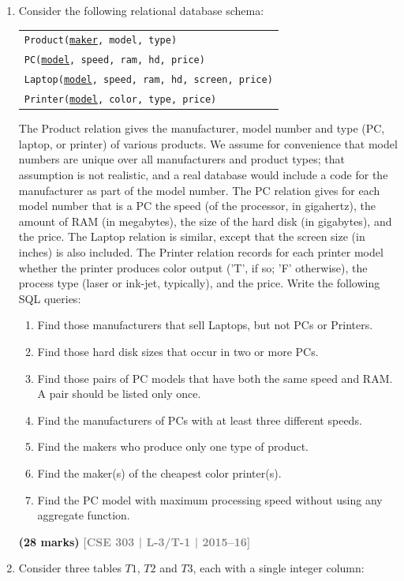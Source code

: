 \documentclass[12pt,a3paper]{article}
\newcommand{\yr}[1]{\hfill\textcolor{gray}{\small\textbf{[#1]}}}
\newcommand{\mk}[1]{\textcolor{orange!70!black}{\small\textbf{(#1 marks)}}}
\begin{document}
\begin{enumerate}
\item Consider the following relational database schema:
\begin{center}
\begin{tabular}{l}
\texttt{Product(\underline{maker}, model, type)}\\
\texttt{PC(\underline{model}, speed, ram, hd, price)}\\
\texttt{Laptop(\underline{model}, speed, ram, hd, screen, price)}\\
\texttt{Printer(\underline{model}, color, type, price)}
\end{tabular}
\end{center}
The Product relation gives the manufacturer, model number and type (PC, laptop, or
printer) of various products. We assume for convenience that model numbers are
unique over all manufacturers and product types; that assumption is not realistic, and a
real database would include a code for the manufacturer as part of the model number.
The PC relation gives for each model number that is a PC the speed (of the processor,
in gigahertz), the amount of RAM (in megabytes), the size of the hard disk (in
gigabytes), and the price. The Laptop relation is similar, except that the screen size (in
inches) is also included. The Printer relation records for each printer model whether
the printer produces color output ('T', if so; 'F' otherwise), the process type (laser or
ink-jet, typically), and the price.
Write the following SQL queries:
\begin{enumerate}
  \item Find those manufacturers that sell Laptops, but not PCs or Printers.
  \item Find those hard disk sizes that occur in two or more PCs.
  \item Find those pairs of PC models that have both the same speed and RAM. A pair should be listed only once.
  \item Find the manufacturers of PCs with at least three different speeds.
  \item Find the makers who produce only one type of product.
  \item Find the maker(s) of the cheapest color printer(s).
  \item Find the PC model with maximum processing speed without using any aggregate function.
\end{enumerate}
\mk{28} \yr{CSE 303 | L-3/T-1 | 2015--16}

\item Consider three tables $T1$, $T2$ and $T3$, each with a single integer column:


\end{enumerate}
\end{document}
